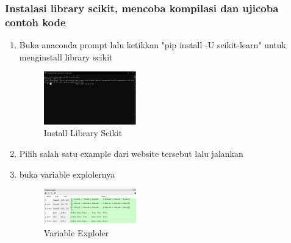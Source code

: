         \subsubsection{Instalasi library scikit, mencoba kompilasi dan ujicoba contoh kode}
        \begin{enumerate}
            \item Buka anaconda prompt lalu ketikkan "pip install -U scikit-learn" untuk menginstall library scikit
            \begin{figure}[H]
                \includegraphics[width=4cm]{figures/1174040/chap1/1.png}
                \centering
                \caption{Install Library Scikit}
            \end{figure}
            \item Pilih salah satu example dari website tersebut lalu jalankan \hfill \break 
            
            \item buka variable explolernya
            \begin{figure}[H]
                \includegraphics[width=4cm]{figures/1174040/chap1/2.png}
                \centering
                \caption{Variable Exploler}
            \end{figure}
        \end{enumerate}
